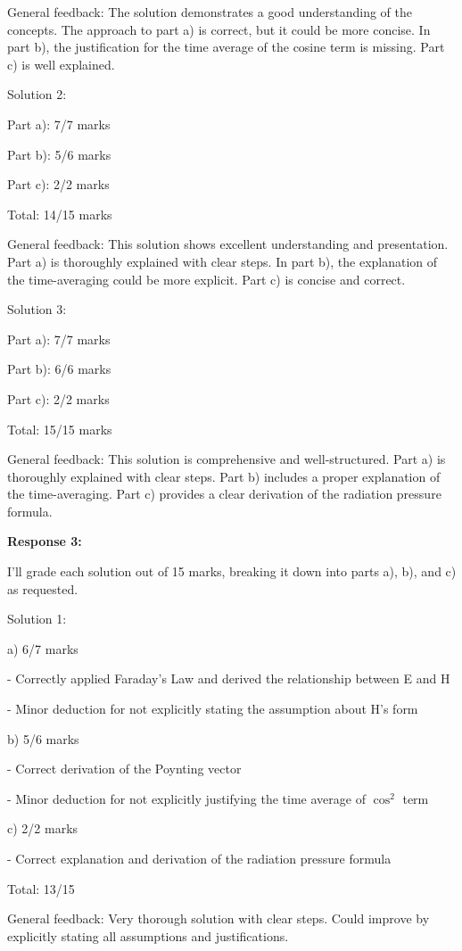 \documentclass[a4paper,11pt]{article}
\begin{document}
General feedback: The solution demonstrates a good understanding of the concepts. The approach to part a) is correct, but it could be more concise. In part b), the justification for the time average of the cosine term is missing. Part c) is well explained.

Solution 2:

Part a): 7/7 marks

Part b): 5/6 marks

Part c): 2/2 marks

Total: 14/15 marks

General feedback: This solution shows excellent understanding and presentation. Part a) is thoroughly explained with clear steps. In part b), the explanation of the time-averaging could be more explicit. Part c) is concise and correct.

Solution 3:

Part a): 7/7 marks

Part b): 6/6 marks

Part c): 2/2 marks

Total: 15/15 marks

General feedback: This solution is comprehensive and well-structured. Part a) is thoroughly explained with clear steps. Part b) includes a proper explanation of the time-averaging. Part c) provides a clear derivation of the radiation pressure formula.

\bigskip
\textbf{Response 3:}

I'll grade each solution out of 15 marks, breaking it down into parts a), b), and c) as requested.

Solution 1:

a) 6/7 marks

- Correctly applied Faraday's Law and derived the relationship between E and H

- Minor deduction for not explicitly stating the assumption about H's form

b) 5/6 marks

- Correct derivation of the Poynting vector

- Minor deduction for not explicitly justifying the time average of \(\cos^2\) term

c) 2/2 marks

- Correct explanation and derivation of the radiation pressure formula

Total: 13/15

General feedback: Very thorough solution with clear steps. Could improve by explicitly stating all assumptions and justifications.
\end{document}
